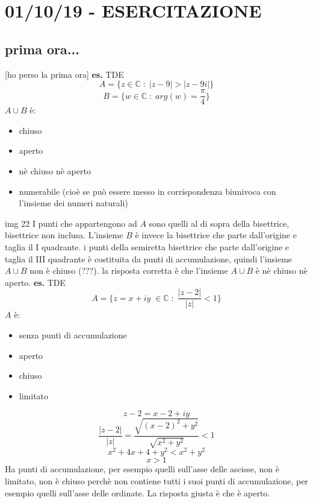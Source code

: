 \section*{01/10/19 - ESERCITAZIONE}
\subsection*{prima ora...}
[ho perso la prima ora]
\newline
\textbf{es.} TDE
\[
    A = \{z \in \mathbb{C} \;:\; |z-9| > |z-9i|\}
\]
\[
    B=\{w \in \mathbb{C} \;:\; arg(w) = \frac{\pi}{4}\}
\]
 $A\cup B$ è:
\begin{itemize}
    \item chiuso
    \item aperto
    \item nè chiuso nè aperto
    \item numerabile (cioè se può essere messo in corrispondenza biunivoca con l'insieme dei numeri naturali)
\end{itemize}
img 22
\newline
I punti che appartengono ad $A$ sono quelli al di sopra della bisettrice, bisettrice non inclusa. L'insieme $B$ è invece la bisettrice che parte dall'origine e taglia il I quadrante.
\newline
i punti della semiretta bisettrice che parte dall'origine e taglia il III quadrante è costituita da punti di accumulazione, quindi l'insieme $A\cup B$ non è chiuso (???).  
\newline
la risposta corretta è che l'insieme $A\cup B$ è nè chiuso nè aperto.
\newline
\newline
\textbf{es.} TDE
\[
    A = \{z = x+iy \; \in \mathbb{C}\;:\; \frac{|z-2|}{|z|}<1 \}
\]
$A$ è:
\begin{itemize}
    \item senza punti di accumulazione
    \item aperto
    \item chiuso
    \item limitato
\end{itemize}
\[
    z-2 = x-2+iy
\]
\[
    \frac{|z-2|}{|z|} = \frac{\sqrt{(x-2)^2+y^2}}{\sqrt{x^2+y^2}}<1
\]
\[
    x^2 +4x +4 +y^2 < x^2+y^2
\]
\[
    x>1
\]
Ha punti di accumulazione, per esempio quelli sull'asse delle ascisse, non è limitato, non è chiuso perchè non contiene tutti i suoi punti di accumulazione, per esempio quelli sull'asse delle ordinate. La risposta giusta è che è aperto.
\newline
